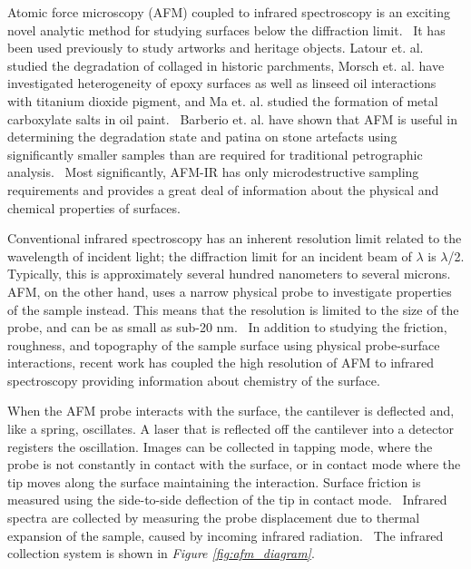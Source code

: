 Atomic force microscopy (AFM) coupled to infrared spectroscopy is an exciting novel analytic method for studying surfaces below the diffraction limit.~\autocite{dazzi2017,kurouski} It has been used previously to study artworks and heritage objects. Latour et. al. studied the degradation of collaged in historic parchments, Morsch et. al. have investigated heterogeneity of epoxy surfaces as well as linseed oil interactions with titanium dioxide pigment, and Ma et. al. studied the formation of metal carboxylate salts in oil paint.~\autocite{latour,Morsch,morsch2016,ma} Barberio et. al. have shown that AFM is useful in determining the degradation state and patina on stone artefacts using significantly smaller samples than are required for traditional petrographic analysis.~\autocite{Barberio} Most significantly, AFM-IR has only microdestructive sampling requirements and provides a great deal of information about the physical and chemical properties of surfaces.~\autocite{dazzi2017,kurouski}

Conventional infrared spectroscopy has an inherent resolution limit related to the wavelength of incident light; the diffraction limit for an incident beam of $\lambda$ is $\lambda$/2. Typically, this is approximately several hundred nanometers to several microns. AFM, on the other hand, uses a narrow physical probe to investigate properties of the sample instead. This means that the resolution is limited to the size of the probe, and can be as small as sub-20 nm.~\autocite{dazzi2017} In addition to studying the friction, roughness, and topography of the sample surface using physical probe-surface interactions, recent work has coupled the high resolution of AFM to infrared spectroscopy providing information about chemistry of the surface.~\autocite{dazzi2017,kurouski}

When the AFM probe interacts with the surface, the cantilever is deflected and, like a spring, oscillates. A laser that is reflected off the cantilever into a detector registers the oscillation. Images can be collected in tapping mode, where the probe is not constantly in contact with the surface, or in contact mode where the tip moves along the surface maintaining the interaction. Surface friction is measured using the side-to-side deflection of the tip in contact mode.~\autocite{friction_afm} Infrared spectra are collected by measuring the probe displacement due to thermal expansion of the sample, caused by incoming infrared radiation.~\autocite{dazzi2017,kurouski} The infrared collection system is shown in \textit{Figure \ref{fig:afm_diagram}}.

